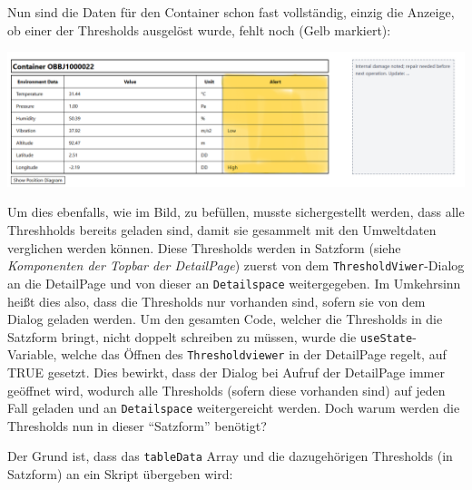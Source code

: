 \documentclass[
    headings=optiontotocandhead,%
    twoside,
    numbers=noenddot,%
    12pt, %
    titlepage, %
    parskip=full, %
    listof=leveldown, 
    numbers=noenddot, %
    a4paper,DIV=14,
    BCOR=15mm,
]{scrbook}
\newcommand{\passthrough}[1]{#1}
\let\origfigure=\figure
\let\endorigfigure=\endfigure
\renewenvironment{figure}[1][]{%
   \origfigure[H]
}{%
   \endorigfigure
}
\begin{document}
Nun sind die Daten für den Container schon fast vollständig, einzig die
Anzeige, ob einer der Thresholds ausgelöst wurde, fehlt noch (Gelb
markiert):

\begin{figure}
\centering
\includegraphics{img/Gekle/DetailSpace.png}
\caption{Aussehen des Detailspace}
\end{figure}

Um dies ebenfalls, wie im Bild, zu befüllen, musste sichergestellt
werden, dass alle Threshholds bereits geladen sind, damit sie gesammelt
mit den Umweltdaten verglichen werden können. Diese Thresholds werden in
Satzform (siehe \emph{Komponenten der Topbar der DetailPage}) zuerst von
dem \passthrough{\lstinline!ThresholdViwer!}-Dialog an die DetailPage
und von dieser an \passthrough{\lstinline!Detailspace!} weitergegeben.
Im Umkehrsinn heißt dies also, dass die Thresholds nur vorhanden sind,
sofern sie von dem Dialog geladen werden. Um den gesamten Code, welcher
die Thresholds in die Satzform bringt, nicht doppelt schreiben zu
müssen, wurde die \passthrough{\lstinline!useState!}-Variable, welche
das Öffnen des \passthrough{\lstinline!Thresholdviewer!} in der
DetailPage regelt, auf TRUE gesetzt. Dies bewirkt, dass der Dialog bei
Aufruf der DetailPage immer geöffnet wird, wodurch alle Thresholds
(sofern diese vorhanden sind) auf jeden Fall geladen und an
\passthrough{\lstinline!Detailspace!} weitergereicht werden. Doch warum
werden die Thresholds nun in dieser ``Satzform'' benötigt?

Der Grund ist, dass das \passthrough{\lstinline!tableData!} Array und
die dazugehörigen Thresholds (in Satzform) an ein Skript übergeben wird:
\end{document}
